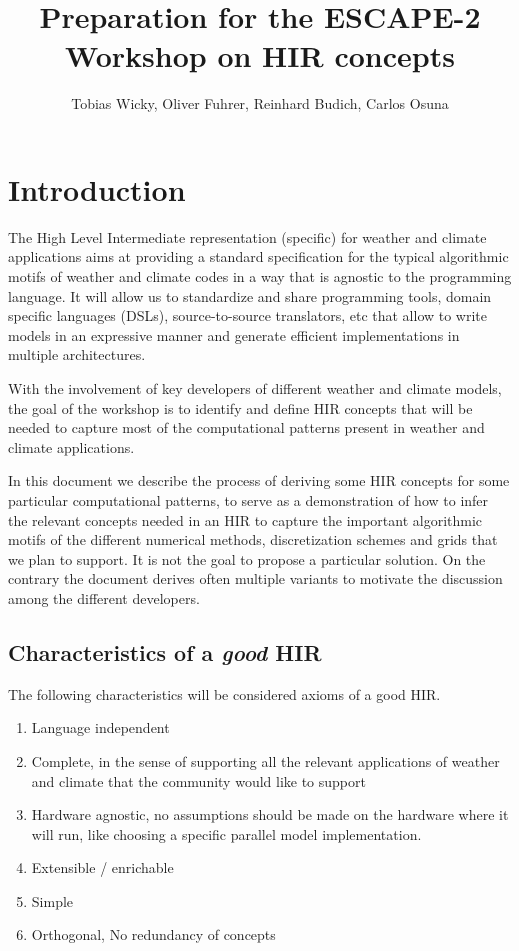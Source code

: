 \documentclass[a4paper,10pt]{scrartcl}
\title{Preparation for the ESCAPE-2 Workshop on HIR concepts}
\author{Tobias Wicky, Oliver Fuhrer, Reinhard Budich, Carlos Osuna}
\begin{document}
\maketitle

\section{Introduction}

The High Level Intermediate representation (specific) for weather and
climate applications aims at providing a standard specification for
the typical algorithmic motifs of weather and climate codes
in a way that is agnostic to the programming language. 
It will allow us to standardize and share programming tools, domain specific languages (DSLs), source-to-source translators, etc that allow to write
models in an expressive manner and generate efficient implementations
in multiple architectures.

With the involvement of key developers of different weather and climate
models, the goal of the workshop is to identify and define HIR concepts
that will be needed to capture most of the computational
patterns present in weather and climate applications.

In this document we describe the process of deriving some HIR concepts 
for some particular computational patterns, to 
serve as a demonstration of how to infer the relevant concepts needed in an HIR to capture the important algorithmic motifs of the different numerical methods, discretization schemes and grids that we plan to support.
It is not the goal to propose a particular solution. On the contrary the document derives often multiple variants to motivate the discussion among the different developers. 

\subsection{Characteristics of a  \textit{good} HIR}
The following characteristics will be considered axioms of a good HIR.
\label{sec:HIRDef}
\begin{enumerate}[label=\textbf{A.\arabic*}]
    \item Language independent 
    \item Complete, in the sense of supporting all the relevant applications of weather and climate that the community would like to support
    \item Hardware agnostic, no assumptions should be made on the hardware where it will run, like choosing a specific parallel model implementation. \label{A:hardware}
    \item Extensible / enrichable
    \item Simple
    \item Orthogonal, No redundancy of concepts \label{A:ortho}
\end{enumerate}
\end{document}
